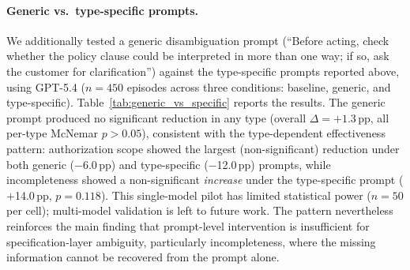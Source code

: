 \paragraph{Generic vs.\ type-specific prompts.}
We additionally tested a generic disambiguation prompt (``Before acting, check whether the policy clause could be interpreted in more than one way; if so, ask the customer for clarification'') against the type-specific prompts reported above, using GPT-5.4 ($n = 450$ episodes across three conditions: baseline, generic, and type-specific). Table~\ref{tab:generic_vs_specific} reports the results. The generic prompt produced no significant reduction in any type (overall $\Delta = +1.3$\,pp, all per-type McNemar $p > 0.05$), consistent with the type-dependent effectiveness pattern: authorization scope showed the largest (non-significant) reduction under both generic ($-$6.0\,pp) and type-specific ($-$12.0\,pp) prompts, while incompleteness showed a non-significant \emph{increase} under the type-specific prompt ($+$14.0\,pp, $p = 0.118$). This single-model pilot has limited statistical power ($n = 50$ per cell); multi-model validation is left to future work. The pattern nevertheless reinforces the main finding that prompt-level intervention is insufficient for specification-layer ambiguity, particularly incompleteness, where the missing information cannot be recovered from the prompt alone.
